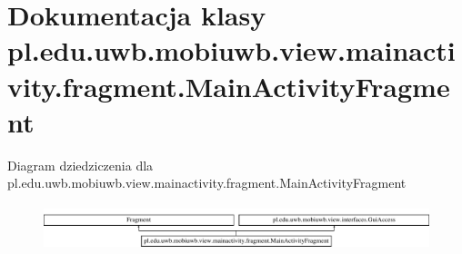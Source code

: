 \hypertarget{classpl_1_1edu_1_1uwb_1_1mobiuwb_1_1view_1_1mainactivity_1_1fragment_1_1_main_activity_fragment}{}\section{Dokumentacja klasy pl.\+edu.\+uwb.\+mobiuwb.\+view.\+mainactivity.\+fragment.\+Main\+Activity\+Fragment}
\label{classpl_1_1edu_1_1uwb_1_1mobiuwb_1_1view_1_1mainactivity_1_1fragment_1_1_main_activity_fragment}
Diagram dziedziczenia dla pl.\+edu.\+uwb.\+mobiuwb.\+view.\+mainactivity.\+fragment.\+Main\+Activity\+Fragment\begin{figure}[H]
\begin{center}
\leavevmode
\includegraphics[height=1.349398cm]{classpl_1_1edu_1_1uwb_1_1mobiuwb_1_1view_1_1mainactivity_1_1fragment_1_1_main_activity_fragment}
\end{center}
\end{figure}
